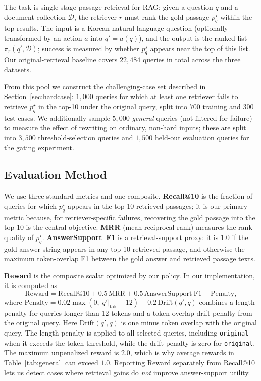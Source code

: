 \documentclass{article}
\begin{document}
The task is single-stage passage retrieval for RAG: given a question $q$ and a
document collection $\mathcal{D}$, the retriever $r$ must rank the gold passage
$p^\star_q$ within the top results. The input is a Korean natural-language
question (optionally transformed by an action $a$ into $q'=a(q)$), and the output
is the ranked list $\pi_r(q',\mathcal{D})$; success is measured by whether
$p^\star_q$ appears near the top of this list. Our original-retrieval baseline
covers $22{,}484$ queries in total across the three datasets.

From this pool we construct the challenging-case set described in
Section~\ref{sec:hardcase}: $1{,}000$ queries for which at least one retriever
fails to retrieve $p^\star_q$ in the top-10 under the original query, split into
$700$ training and $300$ test cases. We additionally sample $5{,}000$ \emph{general} queries (not filtered for
failure) to measure the effect of rewriting on ordinary, non-hard inputs; these
are split into $3{,}500$ threshold-selection queries and $1{,}500$ held-out
evaluation queries for the gating experiment.

\subsection{Evaluation Method}
\label{sec:eval}

We use three standard metrics and one composite. \textbf{Recall@10} is the
fraction of queries for which $p^\star_q$ appears in the top-10 retrieved
passages; it is our primary metric because, for retriever-specific failures,
recovering the gold passage into the top-10 is the central objective.
\textbf{MRR} (mean reciprocal rank) measures the rank quality of $p^\star_q$.
\textbf{AnswerSupport~F1} is a retrieval-support proxy: it is $1.0$ if the gold
answer string appears in any top-10 retrieved passage, and otherwise the maximum
token-overlap F1 between the gold answer and retrieved passage texts.

\textbf{Reward} is the composite scalar optimized by our policy. In our
implementation, it is computed as
\begin{equation}
\mathrm{Reward}
=
\mathrm{Recall@10}
+0.5\,\mathrm{MRR}
+0.5\,\mathrm{AnswerSupport~F1}
-\mathrm{Penalty},
\label{eq:reward}
\end{equation}
where $\mathrm{Penalty}=0.02\max(0, |q'|_{\mathrm{tok}}-12)
+0.2\,\mathrm{Drift}(q',q)$ combines a length penalty for queries longer than
12 tokens and a token-overlap drift penalty from the original query. Here
$\mathrm{Drift}(q',q)$ is one minus token overlap with the original query. The
length penalty is applied to all selected queries, including \texttt{original}
when it exceeds the token threshold, while the drift penalty is zero for
\texttt{original}. The maximum unpenalized reward is $2.0$, which is why average rewards in
Table~\ref{tab:general} can exceed $1.0$. Reporting Reward separately from
Recall@10 lets us detect cases where retrieval gains do \emph{not} improve
answer-support utility.
\end{document}
